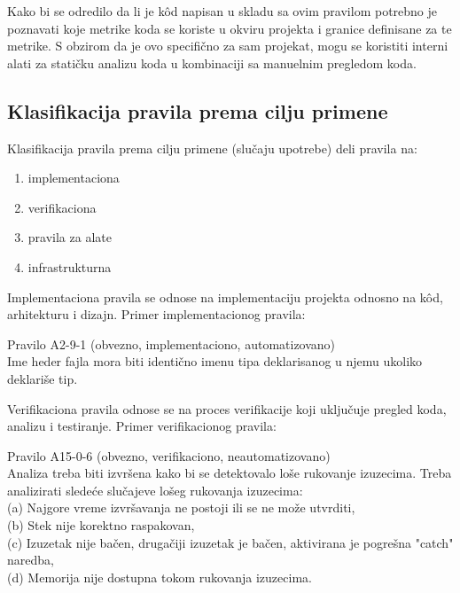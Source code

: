 \documentclass[12pt,oneside]{memoir}
\begin{document}

  Kako bi se odredilo da li je k\^{o}d napisan u skladu sa ovim pravilom potrebno je poznavati koje metrike koda se koriste u okviru projekta i
  granice definisane za te metrike. S obzirom da je ovo specifično za sam projekat, mogu se koristiti interni alati za statičku analizu koda u kombinaciji
  sa manuelnim pregledom koda. 

\subsection{Klasifikacija pravila prema cilju primene}
Klasifikacija pravila prema cilju primene (slučaju upotrebe) deli pravila na:

\begin{enumerate}
  \item{implementaciona}
  \item{verifikaciona}
  \item{pravila za alate}
  \item{infrastrukturna}
\end{enumerate}

Implementaciona pravila se odnose na implementaciju projekta odnosno na k\^{o}d, arhitekturu i dizajn.
Primer implementacionog pravila:

\begin{center}
\begin{tcolorbox}
Pravilo A2-9-1 (obvezno, implementaciono, automatizovano) \\
Ime heder fajla mora biti identično imenu tipa deklarisanog u njemu ukoliko deklariše tip.
\end{tcolorbox}
\end{center}


Verifikaciona pravila odnose se na proces verifikacije koji uključuje pregled koda, analizu i testiranje.
Primer verifikacionog pravila:

\begin{center}
\begin{tcolorbox}
Pravilo A15-0-6 (obvezno, verifikaciono, neautomatizovano) \\
Analiza treba biti izvršena kako bi se detektovalo loše rukovanje izuzecima. Treba analizirati slede\'ce slučajeve lošeg rukovanja izuzecima: \\
(a) Najgore vreme izvršavanja ne postoji ili se ne može utvrditi, \\
(b) Stek nije korektno raspakovan, \\
(c) Izuzetak nije bačen, drugačiji izuzetak je bačen, aktivirana je pogre\v{s}na "catch" naredba, \\
(d) Memorija nije dostupna tokom rukovanja izuzecima.
\end{tcolorbox}
\end{center}
\end{document}
